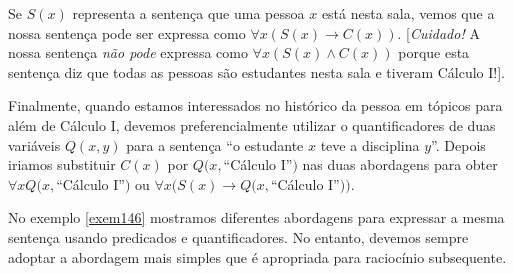 Se $S(x)$ representa a sentença que uma pessoa $x$ está nesta sala, vemos que a
nossa sentença pode ser expressa como $\forall x(S(x) \to C(x))$.
[\emph{Cuidado!} A nossa sentença \emph{não pode} expressa como $\forall
x(S(x) \land C(x))$ porque esta sentença diz que todas as pessoas são
estudantes nesta sala e tiveram Cálculo I!].

Finalmente, quando estamos interessados no histórico da pessoa em tópicos para
além de Cálculo I, devemos preferencialmente utilizar o quantificadores de duas
variáveis $Q(x,y)$ para a sentença ``o estudante $x$ teve a disciplina $y$''.
Depois iriamos substituir $C(x)$ por $Q(x, $``Cálculo I''$)$ nas duas abordagens
para obter $\forall xQ(x, $``Cálculo I''$)$ ou $\forall x(S(x) \to Q(x,
$``Cálculo I''$))$.

No exemplo \ref{exem146} mostramos diferentes abordagens para expressar a mesma
sentença usando predicados e quantificadores. No entanto, devemos sempre adoptar
a abordagem mais simples que é apropriada para raciocínio subsequente.

